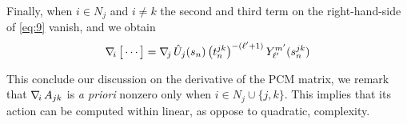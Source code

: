 Finally, when $i \in N_j$ and $i \not=k$ the second and third term on the right-hand-side of \eqref{eq:9} vanish, and we obtain 
\[
\nabla_{\!i}\, \big[ \cdots \big] = \nabla_{\!j}\, \hat{U}_j(s_n)  \,  \big( t_n^{jk}\big)^{-(\ell'+1)} \, Y_{\ell'}^{m'} (s_n^{jk})
\]

This conclude our discussion on the derivative of the PCM matrix, we remark that $\nabla_{\!i}\, A_{jk}$ is \emph{a priori} nonzero only when $i \in N_j \cup \{ j,k\}$. This implies that its action can be computed within linear, as oppose to quadratic, complexity.


%
